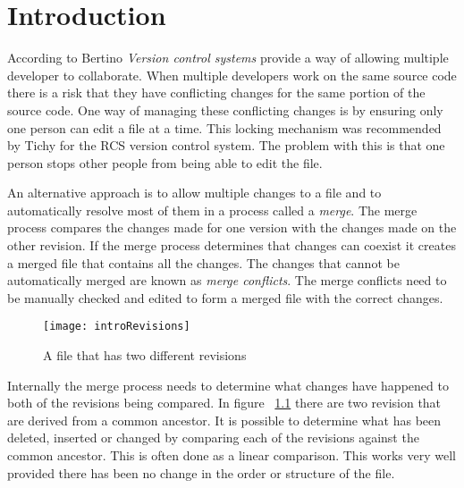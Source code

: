 
\chapter{Introduction}\label{C:intro}

According to Bertino \cite{Bertino2012} \emph{Version control systems} provide a way of allowing multiple developer to collaborate. When multiple developers work on the same source code there is a risk that they have conflicting changes for the same portion of the source code.  One way of managing these conflicting changes is by ensuring only one person can edit a file at a time. This locking mechanism was recommended by Tichy \cite{Tichy1982} for the RCS version control system. The problem with this is that one person stops other people from being able to edit the file. 

An alternative approach is to allow multiple changes to a file and to automatically resolve most of them in a process called a \emph{merge}.  The merge process compares the changes made for one version with the changes made on the other revision. If the merge process determines that changes can coexist it creates a merged file that contains all the changes. The changes that cannot be automatically merged are known as \emph{merge conflicts}.  The merge conflicts need to be manually checked and edited to form a merged file with the correct changes.

\begin{figure}[h]
 \begin{center}
 \texttt{[image: introRevisions]}
 \end{center}
 \caption{A file that has two different revisions}
 \label{fig:introRevisions}
\end{figure}


Internally the merge process needs to determine what changes have happened to both of the revisions being compared. In figure  ~\ref{fig:introRevisions} there are two revision that are derived from a common ancestor. It is possible to determine what has been deleted, inserted or changed by comparing each of the revisions against the common ancestor.  This is often done as a linear comparison. This works very well provided there has been no change in the order or structure of the file.


